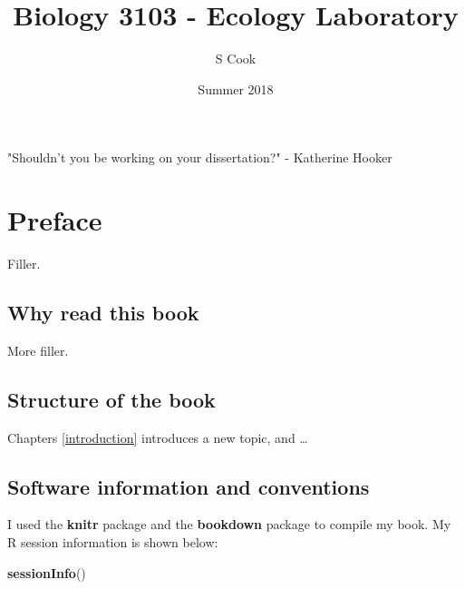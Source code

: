 \documentclass[]{krantz}
\title{Biology 3103 - Ecology Laboratory}
\author{S Cook}
\date{Summer 2018}
\makeatletter
\newenvironment{Shaded}{\begin{snugshade}}{\end{snugshade}}
\newcommand{\KeywordTok}[1]{\textcolor[rgb]{0.13,0.29,0.53}{\textbf{#1}}}
\newcommand{\NormalTok}[1]{#1}
\newenvironment{kframe}{%
\medskip{}
\setlength{\fboxsep}{.8em}
 \def\at@end@of@kframe{}%
 \ifinner\ifhmode%
  \def\at@end@of@kframe{\end{minipage}}%
  \begin{minipage}{\columnwidth}%
 \fi\fi%
 \def\FrameCommand##1{\hskip\@totalleftmargin \hskip-\fboxsep
 \colorbox{shadecolor}{##1}\hskip-\fboxsep
     \hskip-\linewidth \hskip-\@totalleftmargin \hskip\columnwidth}%
 \MakeFramed {\advance\hsize-\width
   \@totalleftmargin\z@ \linewidth\hsize
   \@setminipage}}%
 {\par\unskip\endMakeFramed%
 \at@end@of@kframe}
\renewenvironment{Shaded}{\begin{kframe}}{\end{kframe}}
\theoremstyle{definition}
\theoremstyle{definition}
\theoremstyle{definition}
\theoremstyle{remark}
\makeatother
\begin{document}
\maketitle


\thispagestyle{empty}

\begin{center}
"Shouldn't you be working on your dissertation?"
- Katherine Hooker
\end{center}

\setlength{\abovedisplayskip}{-5pt}
\setlength{\abovedisplayshortskip}{-5pt}

{
\hypersetup{linkcolor=black}
\setcounter{tocdepth}{2}
\tableofcontents
}
\listoftables
\listoffigures
\chapter*{Preface}\label{preface}


Filler.

\section*{Why read this book}\label{why-read-this-book}


More filler.

\section*{Structure of the book}\label{structure-of-the-book}


Chapters \ref{introduction} introduces a new topic, and \ldots{}

\section*{Software information and
conventions}\label{software-information-and-conventions}


I used the \textbf{knitr} package \citep{xie2015} and the
\textbf{bookdown} package \citep{R-bookdown} to compile
my book. My R session information is shown below:

\begin{Shaded}
\begin{Highlighting}[]
\KeywordTok{sessionInfo}\NormalTok{()}
\end{Highlighting}
\end{Shaded}
\end{document}

